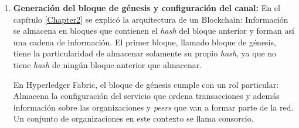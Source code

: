 \begin{enumerate}
    Una vez que se pudo establecer una organización lógica de las organizaciones y \textit{peers}, es necesario generar el material criptográfico correspondiente. Para eso, se ejecuta la herramienta cryptogen en la \textit{shell} con el siguiente comando: 
    \begin{verbatim}
    $ ./cryptogen generate --config=./crypto-config.yaml
    \end{verbatim}
    Durante la ejecución se crea una carpeta en el mismo directorio que lleva el nombre \textit{crypto-config}. Dicha carpeta contiene las identidades digitales de todos los participantes de la red. Una parte de su estructura y contenidos se muestra en la figura \ref{fig:crypto-config}
    \begin{figure}
        \caption{Directorios y archivos de la carpeta \textit{crypto-config}}
        \label{fig:crypto-config}
    \end{figure}
    \item \textbf{Generación del bloque de génesis y configuración del canal: }En el capítulo \ref{Chapter2} se explicó la arquitectura de un Blockchain: Información se almacena en bloques que contienen el \textit{hash} del bloque anterior y forman así una cadena de información. El primer bloque, llamado bloque de génesis, tiene la particularidad de almacenar solamente su propio \textit{hash}, ya que no tiene \textit{hash} de ningún bloque anterior que almacenar.
    
    En Hyperledger Fabric, el bloque de génesis cumple con un rol particular: Almacena la configuración del servicio que ordena transacciones y además información sobre las organizaciones y \textit{peers} que van a formar parte de la red. Un conjunto de organizaciones en este contexto se llama consorcio.


\end{enumerate}

